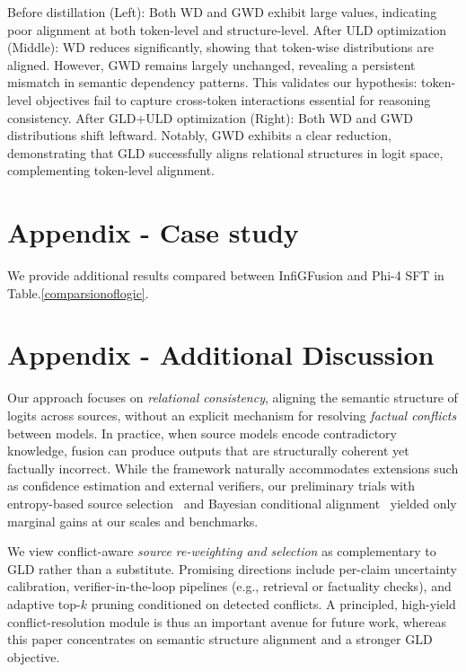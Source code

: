 \documentclass{article}
\begin{document}
Before distillation (Left): Both WD and GWD exhibit large values, indicating poor alignment at both token-level and structure-level.
After ULD optimization (Middle): WD reduces significantly, showing that token-wise distributions are aligned. However, GWD remains largely unchanged, revealing a persistent mismatch in semantic dependency patterns. This validates our hypothesis: token-level objectives fail to capture cross-token interactions essential for reasoning consistency.
After GLD+ULD optimization (Right): Both WD and GWD distributions shift leftward. Notably, GWD exhibits a clear reduction, demonstrating that GLD successfully aligns relational structures in logit space, complementing token-level alignment.

\section{Appendix - Case study}
We provide additional results compared between InfiGFusion and Phi-4 SFT in Table.\ref{comparsionoflogic}.

\section{Appendix - Additional Discussion}
\label{app:additional-discussion}
Our approach focuses on \emph{relational consistency}, aligning the semantic structure of logits across sources, without an explicit mechanism for resolving \emph{factual conflicts} between models. In practice, when source models encode contradictory knowledge, fusion can produce outputs that are structurally coherent yet factually incorrect. While the framework naturally accommodates extensions such as confidence estimation and external verifiers, our preliminary trials with entropy-based source selection~\cite{wanknowledge} and Bayesian conditional alignment~\cite{ye2024bayes} yielded only marginal gains at our scales and benchmarks.

We view conflict-aware \emph{source re-weighting and selection} as complementary to GLD rather than a substitute. Promising directions include per-claim uncertainty calibration, verifier-in-the-loop pipelines (e.g., retrieval or factuality checks), and adaptive top-$k$ pruning conditioned on detected conflicts. A principled, high-yield conflict-resolution module is thus an important avenue for future work, whereas this paper concentrates on semantic structure alignment and a stronger GLD objective.
\end{document}

